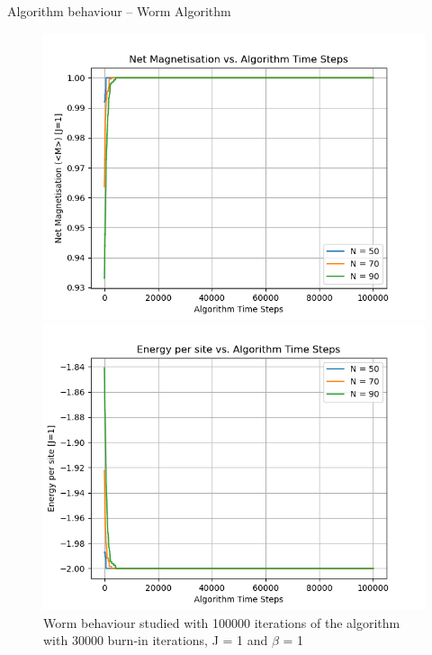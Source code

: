 \documentclass{beamer}
\begin{document}
\begin{frame}{Algorithm behaviour – Worm Algorithm}
    \begin{figure}[htbp]
		\begin{minipage}[t]{0.49\linewidth}
			\centering
			\includegraphics[width=\linewidth]{worm_algobehaviour1.png}
		\end{minipage}
		\begin{minipage}[t]{0.49\linewidth}
			\centering
			\includegraphics[width=\linewidth]{worm_algobehaviour2.png}
		\end{minipage}
    \caption{Worm behaviour studied with 100000 iterations of the algorithm with 30000 burn-in iterations, J = 1 and $\beta$ = 1}
    \end{figure}
\end{frame}
\end{document}
